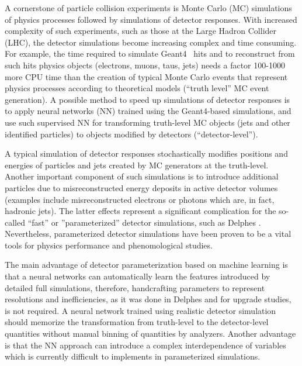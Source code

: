 \documentclass[showpacs,showkeys,preprint,prd,nofootinbib,linenumbers,12pt,superscriptaddress]{revtex4-1}
\begin{document}
A cornerstone of particle collision experiments is Monte Carlo (MC) simulations of physics processes followed by simulations of detector responses. With increased complexity of such experiments, such as those at the Large Hadron Collider (LHC), the detector simulations become increasing complex and time consuming.  For example, the time required to simulate Geant4~\cite{Agostinelli:2002hh} hits and to reconstruct from such hits physics objects (electrons, muons, taus, jets) needs a factor 100-1000 more CPU time than the creation of typical Monte Carlo events that represent physics processes according to theoretical models (``truth level'' MC event generation).  A possible method to speed up simulations of detector responses is to apply neural networks (NN) trained using the Geant4-based simulations, and use such supervised NN for transforming truth-level MC objects (jets and other identified particles) to objects modified by detectors (``detector-level'').  

A typical simulation of detector responses stochastically modifies positions and energies of particles and jets created by MC generators at the truth-level. Another important component of such simulations is to introduce additional particles due to misreconstructed energy deposits in active detector volumes  (examples include misreconstructed electrons or photons which are, in fact, hadronic jets). The latter effects represent a significant complication for the so-called ``fast'' or ''parameterized'' detector simulations, such as Delphes \cite{deFavereau:2013fsa}. Nevertheless, parameterized detector simulations have been proven to be a vital tools for physics performance and phenomological studies.

The main advantage of detector parameterization based on machine learning is that a neural networks can automatically learn the features introduced by detailed full simulations, therefore, handcrafting parameters to represent resolutions and inefficiencies, as it was done in Delphes and for upgrade studies, is not required. A neural network trained using realistic detector simulation should memorize the transformation from truth-level to the detector-level quantities without manual binning of quantities by analyzers. Another advantage is that the NN approach can introduce a complex interdependence of variables which is currently difficult to implements in parameterized simulations. %
\end{document}
